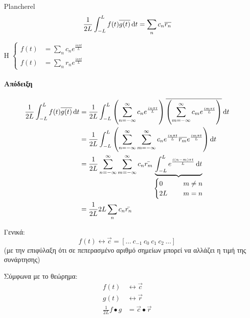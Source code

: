 \documentclass[11pt,a4paper,titlepage,final]{article}
\begin{document}
\begin{theorem}{\textlatin{Plancherel}}{}
\[
\frac{1}{2L} \int_{-L}^L f(t) \overline{g(t)} \dif t =
\sum_n c_n \overline{r_n}
\]

Η \(\begin{cases}
f(t)&= \sum_n c_n e^\frac{in\pi t}{L} \\
f(t)&= \sum_n r_n e^\frac{in\pi t}{L}
\end{cases}\)
\end{theorem}

\paragraph{Απόδειξη}
\begin{align*}
\frac{1}{2L} \int_{-L}^L f(t) \overline{g(t)} \dif t &=
\frac{1}{2L} \int_{-L}^L
	\left( \sum_{n=-\infty}^\infty c_n e^\frac{in\pi t}{L}
	\right)
	\overline{\left(
	\sum_{m=-\infty}^\infty c_m e^\frac{im\pi t}{L}
	\right)}
	\dif t
\\ &=
\frac{1}{2L} \int_{-L}^L \left(
\sum_{n=-\infty}^\infty \sum_{m=-\infty}^\infty
c_n e^\frac{in\pi t}{L}
\overline{r_m} e^\frac{im\pi t}{L} \right) \dif t
\\ &=
\frac{1}{2L}
\sum_{n=-\infty}^\infty
\sum_{m=-\infty}^\infty
c_n \bar{r_m}
\underbrace{\int_{-L}^L
e^\frac{i(n-m)\pi t}{L} \dif t}_{
\begin{cases}
0 \qquad & m \neq n\\
2L & m = n
\end{cases}
}
\\ &= \frac{1}{2L} 2L \sum_n c_n\bar{r_n}
\end{align*}

Γενικά:
\[
f(t) \leftrightarrow \vec{c} = [ \dots \ c_{-1}\  c_0\  c_1\ c_2\ \dots ]
\]
(με την επιφύλαξη ότι σε πεπερασμένο αριθμό σημείων μπορεί να αλλάζει η τιμή της συνάρτησης)

Σύμφωνα με το θεώρημα:
\begin{align*}
f(t) &\leftrightarrow \vec{c} \\
g(t) &\leftrightarrow \vec{r} \\
 \frac{1}{2L} f\bullet g &= \vec{c} \bullet \vec{r}
\end{align*}
\end{document}
